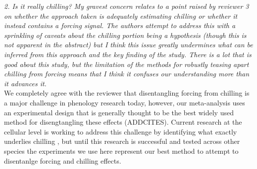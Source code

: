 \documentclass[11pt, a4paper]{article}
\begin{document}
\emph{2. Is it really chilling? My gravest concern relates to a point raised by reviewer 3 on whether the
approach taken is adequately estimating chilling or whether it instead contains a forcing signal.
The authors attempt to address this with a sprinkling of caveats about the chilling portion
being a hypothesis (though this is not apparent in the abstract) but I think this issue greatly
undermines what can be inferred from this approach and the key finding of the study. There is
a lot that is good about this study, but the limitation of the methods for robustly teasing apart
chilling from forcing means that I think it confuses our understanding more than it advances it.}\\

We completely agree with the reviewer that disentangling forcing from chilling is a major challenge in phenology research today, however, our meta-analysis uses an experimental design that is generally thought to be the best widely used method for disengtangling these effects (ADDCITES). Current research at the cellular level is working to address this challenge by identifying what exactly underlies chilling \citep[e.g., work on the compound callous, see][]{rinne2011,vanderschoot2014}, but until this research is successful and tested across other species the experiments we use here represent our best method to attempt to disentanlge forcing and chilling effects. \\
\end{document}
